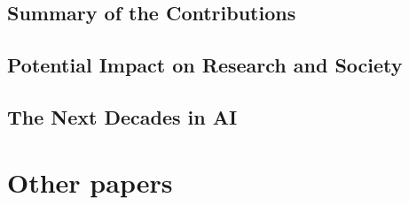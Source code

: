 \documentclass[withindex,glossary]{cam-thesis}
\theoremstyle{plain}
\theoremstyle{definition}
\theoremstyle{remark}
\begin{document}
\section{Summary of the Contributions}

\section{Potential Impact on Research and Society}

\section{The Next Decades in AI}



\chapter*{Other papers}
\nobibliography*






%

\renewcommand{\bibname}{References}
\cleardoublepage
{}
{}
%









\end{document}
